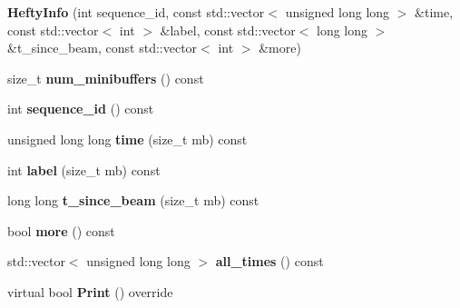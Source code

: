 \begin{DoxyCompactItemize}
\item 
\hypertarget{classHeftyInfo_af721faddd429a02ea7651108185ec478}{
{\bfseries HeftyInfo} (int sequence\_\-id, const std::vector$<$ unsigned long long $>$ \&time, const std::vector$<$ int $>$ \&label, const std::vector$<$ long long $>$ \&t\_\-since\_\-beam, const std::vector$<$ int $>$ \&more)}
\label{classHeftyInfo_af721faddd429a02ea7651108185ec478}

\item 
\hypertarget{classHeftyInfo_a1e9b9d3197a8df5bff0432f1f814109b}{
size\_\-t {\bfseries num\_\-minibuffers} () const }
\label{classHeftyInfo_a1e9b9d3197a8df5bff0432f1f814109b}

\item 
\hypertarget{classHeftyInfo_ab9b5565e7b54b73eb83fd72c3e10a349}{
int {\bfseries sequence\_\-id} () const }
\label{classHeftyInfo_ab9b5565e7b54b73eb83fd72c3e10a349}

\item 
\hypertarget{classHeftyInfo_a9da6b668891f3a104f5fe6b5026e0969}{
unsigned long long {\bfseries time} (size\_\-t mb) const }
\label{classHeftyInfo_a9da6b668891f3a104f5fe6b5026e0969}

\item 
\hypertarget{classHeftyInfo_a2455de20fa2e072b68f58f37307c1989}{
int {\bfseries label} (size\_\-t mb) const }
\label{classHeftyInfo_a2455de20fa2e072b68f58f37307c1989}

\item 
\hypertarget{classHeftyInfo_a6880deb111e4b3f3d1d0bf0be8e4290e}{
long long {\bfseries t\_\-since\_\-beam} (size\_\-t mb) const }
\label{classHeftyInfo_a6880deb111e4b3f3d1d0bf0be8e4290e}

\item 
\hypertarget{classHeftyInfo_abb3cfed8ce0e9d03024d62a5687746cc}{
bool {\bfseries more} () const }
\label{classHeftyInfo_abb3cfed8ce0e9d03024d62a5687746cc}

\item 
\hypertarget{classHeftyInfo_a9f6297619ba660d09a294ad599d3273e}{
std::vector$<$ unsigned long long $>$ {\bfseries all\_\-times} () const }
\label{classHeftyInfo_a9f6297619ba660d09a294ad599d3273e}

\item 
\hypertarget{classHeftyInfo_a4184a22ba444cbfcc94b95bc5b0df49b}{
virtual bool {\bfseries Print} () override}
\label{classHeftyInfo_a4184a22ba444cbfcc94b95bc5b0df49b}

\end{DoxyCompactItemize}
